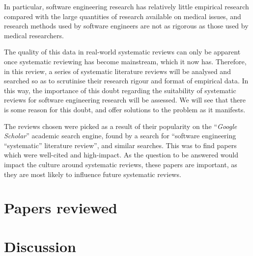 \begin{displayquote}
    In particular, software engineering research has relatively little empirical research compared with the large quantities of research available on medical issues, and research methods used by software engineers are not as rigorous as those used by medical researchers.~\citep{Kitchenham2004}
\end{displayquote}

The quality of this data in real-world systematic reviews can only be apparent once systematic reviewing has become mainstream, which it now has. Therefore, in this review, a series of systematic literature reviews will be analysed and searched so as to scrutinise their research rigour and format of empirical data. In this way, the importance of this doubt regarding the suitability of systematic reviews for software engineering research will be assessed. We will see that there is some reason for this doubt, and offer solutions to the problem as it manifests.\par

The reviews chosen were picked as a result of their popularity on the ``\emph{Google Scholar}'' academic search engine, found by a search for ``software engineering ``systematic'' literature review'', and similar searches. This was to find papers which were well-cited and high-impact. As the question to be answered would impact the culture around systematic reviews, these papers are important, as they are most likely to influence future systematic reviews.\par


\section{Papers reviewed}








\section{Discussion}\label{sec:discussion}


